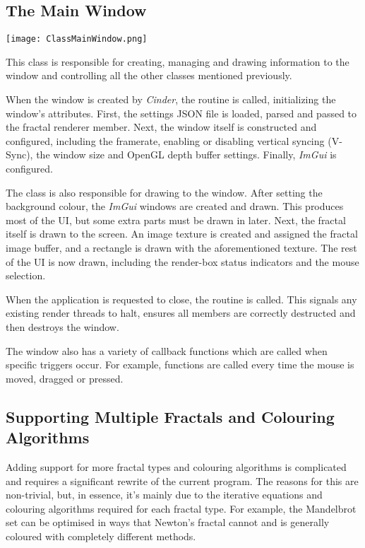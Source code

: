 \subsection{The Main Window}

\FloatBarrier
\begin{figure*}[htp]
	\centering
	\texttt{[image: ClassMainWindow.png]}
\end{figure*}
\FloatBarrier

This class is responsible for creating, managing and drawing information to the window and controlling all the other classes mentioned previously.

\vspace{0.5cm}
\noindent
When the window is created by \textit{Cinder}, the  routine is called, initializing the window's attributes. First, the settings JSON file is loaded, parsed and passed to the fractal renderer member. Next, the window itself is constructed and configured, including the framerate, enabling or disabling vertical syncing (V-Sync), the window size and OpenGL depth buffer settings. Finally, \textit{ImGui} is configured.

The  class is also responsible for drawing to the window. After setting the background colour, the \textit{ImGui} windows are created and drawn. This produces most of the UI, but some extra parts must be drawn in later. Next, the fractal itself is drawn to the screen. An image texture is created and assigned the fractal image buffer, and a rectangle is drawn with the aforementioned texture. The rest of the UI is now drawn, including the render-box status indicators and the mouse selection.

When the application is requested to close, the  routine is called. This signals any existing render threads to halt, ensures all members are correctly destructed and then destroys the window.

The window also has a variety of callback functions which are called when specific triggers occur. For example, functions are called every time the mouse is moved, dragged or pressed.

\subsection{Supporting Multiple Fractals and Colouring Algorithms}

Adding support for more fractal types and colouring algorithms is complicated and requires a significant rewrite of the current program. The reasons for this are non-trivial, but, in essence, it's mainly due to the iterative equations and colouring algorithms required for each fractal type. For example, the Mandelbrot set can be optimised in ways that Newton's fractal cannot and is generally coloured with completely different methods.

